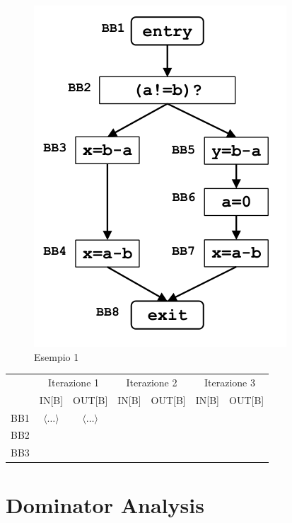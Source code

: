 \documentclass[10pt,a4paper]{article}
\begin{document}
\begin{figure}[h]
  \centering
  \includegraphics[width=.5\textwidth]{example-1.png}
  \caption{Esempio 1}
\end{figure}

\begin{table}[h!]
\centering
\renewcommand{\arraystretch}{1.5}
\begin{tabular}{|c|c|c|c|c|c|c|}
\hline
\rowcolor{blue!30}
 & \multicolumn{2}{c|}{Iterazione 1} & \multicolumn{2}{c|}{Iterazione 2} & \multicolumn{2}{c|}{Iterazione 3} \\
\rowcolor{blue!30}
 & IN[B] & OUT[B] & IN[B] & OUT[B] & IN[B] & OUT[B] \\
\hline
BB1 & $\langle \ldots \rangle$ & $\langle \ldots \rangle$ & & & & \\
\hline
BB2 & & & & & & \\
\hline
BB3 & & & & & & \\
\hline
\end{tabular}
\end{table}




\section{Dominator Analysis}
\end{document}
